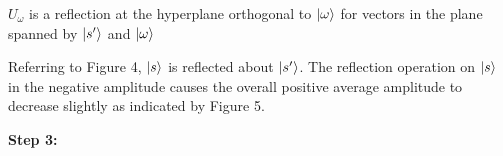 \documentclass{article}
\begin{document}
$U_{{\omega }}$ is a reflection at the hyperplane orthogonal to $\ket{\omega}$  for vectors in the plane spanned by $\ket{s'}$  and $\ket{\omega}$ 
\vspace{5mm}

Referring to Figure 4, $\ket{s}$ is reflected about $\ket{s'}$. The reflection operation on $\ket{s}$ in the negative amplitude causes the overall positive average amplitude to decrease slightly as indicated by Figure 5. 
\vspace{5mm}

\textbf{Step 3:}
\vspace{5mm}



\begin{tikzpicture}[x=0.75pt,y=0.75pt,yscale=-1,xscale=1]


\end{tikzpicture}
\end{document}
